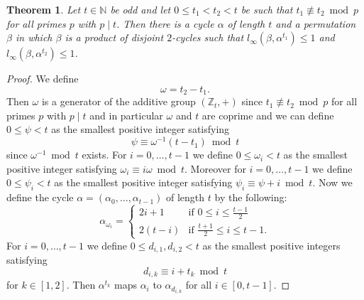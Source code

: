\documentclass{article}
\newtheorem{theorem}{Theorem}
\begin{document}
\begin{theorem}\label{theoremlinftyl1l2}
Let $t \in \mathbb{N}$ be odd and let $0 \leq t_1 < t_2 < t$ be such that $t_1 \not \equiv t_2 \bmod p$ for all primes $p$ with $p \mid t$. Then there is a cycle $\alpha$ of length $t$ and a permutation $\beta$ in which $\beta$ is a product of disjoint $2$-cycles such that $l_\infty(\beta, \alpha^{t_1}) \leq 1$ and $l_\infty(\beta, \alpha^{t_2}) \leq 1$.
\end{theorem}
\begin{proof}
We define
\begin{displaymath}
\omega = t_2-t_1.
\end{displaymath}
Then $\omega$ is a generator of the additive group $(\mathbb{Z}_t,+)$ since $t_1 \not \equiv t_2 \bmod p$ for all primes $p$ with $p \mid t$ and in particular $\omega$ and $t$ are coprime and we can define $0 \leq \psi < t$ as the smallest positive integer satisfying
\begin{displaymath}
\psi \equiv \omega^{-1}(t-t_1) \bmod t
\end{displaymath}
since $\omega^{-1} \bmod t$ exists. For $i=0,\dots,t-1$ we define $0 \leq \omega_i < t$ as the smallest positive integer satisfying $\omega_i \equiv i\omega \bmod t$. Moreover for $i=0,\dots,t-1$ we define $0 \leq \psi_i < t$ as the smallest positive integer satisfying $\psi_i \equiv \psi + i \bmod t$. Now we define the cycle $\alpha = (\alpha_0,\dots,\alpha_{t-1})$ of length $t$ by the following:
\begin{displaymath}
\alpha_{\omega_i} = \begin{cases}
2i+1 & \text{if } 0 \leq i \leq \frac{t-1}{2}\\
2(t-i) & \text{if } \frac{t+1}{2} \leq i \leq t-1.
\end{cases}
\end{displaymath}
For $i=0,\dots,t-1$ we define $0 \leq d_{i,1},d_{i,2} < t$ as the smallest positive integers satisfying
\begin{displaymath}
d_{i,k} \equiv i + t_k \bmod t
\end{displaymath}
for $k \in [1,2]$. Then $\alpha^{t_k}$ maps $\alpha_i$ to $\alpha_{d_{i,k}}$ for all $i \in [0,t-1]$.


\end{proof}
\end{document}

